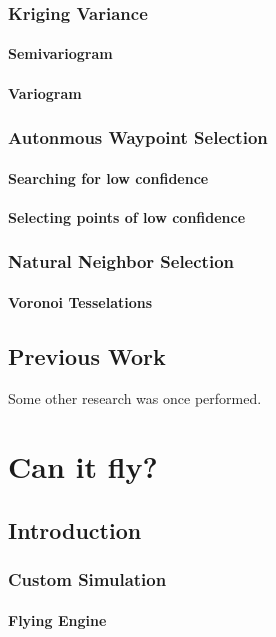 \documentclass[11pt]{ucthesis}
\begin{document}
\section{Kriging Variance}
\subsection{Semivariogram}
\subsection{Variogram}

\section{Autonmous Waypoint Selection}
\subsection{Searching for low confidence}
\subsection{Selecting points of low confidence}

\section{Natural Neighbor Selection}
\subsection{Voronoi Tesselations}

\chapter{Previous Work}
Some other research was once performed.

\part{Can it fly?}
\chapter{Introduction}

\section{Custom Simulation}
\subsection{Flying Engine}
\end{document}
